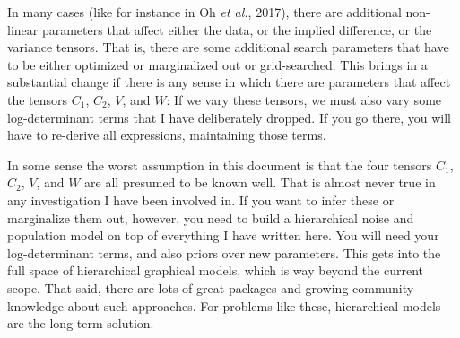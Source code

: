 \documentclass[12pt,letterpaper]{article}
\newcommand{\foreign}[1]{\textsl{#1}}
\newcommand{\etal}{\foreign{et al.}}
\begin{document}
In many cases (like for instance in Oh \etal, 2017), there are
additional non-linear parameters that affect either the data, or the
implied difference, or the variance tensors. That is, there are some
additional search parameters that have to be either optimized or
marginalized out or grid-searched. This brings in a substantial change
if there is any sense in which there are parameters that affect the
tensors $C_1$, $C_2$, $V$, and $W$: If we vary these tensors, we must
also vary some log-determinant terms that I have deliberately
dropped. If you go there, you will have to re-derive all expressions,
maintaining those terms.

In some sense the worst assumption in this document is that the four
tensors $C_1$, $C_2$, $V$, and $W$ are all presumed to be known well.
That is almost never true in any investigation I have been involved
in.  If you want to infer these or marginalize them out, however, you
need to build a hierarchical noise and population model on top of
everything I have written here. You will need your log-determinant
terms, and also priors over new parameters. This gets into the full
space of hierarchical graphical models, which is way beyond the
current scope. That said, there are lots of great packages and growing
community knowledge about such approaches. For problems like these,
hierarchical models are the long-term solution.

\newcommand{\arXiv}[1]{\href{http://arxiv.org/abs/#1}{\textsl{arXiv}:#1}}
\end{document}
